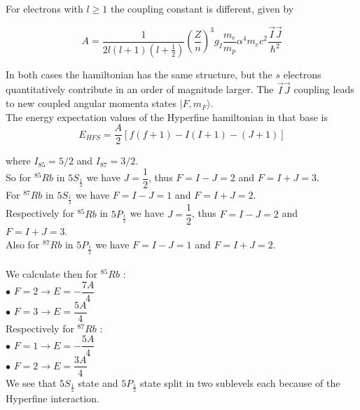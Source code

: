 \documentclass[openany,11pt,a4paper]{book}
\begin{document}
For electrons with $l \geq 1$ the coupling constant is different, given by 

\begin{equation}
A= \dfrac{1}{2l(l+1)(l+ \frac{1}{2})} (\dfrac{Z}{n})^{3} g_{I} \dfrac{m_{e}}{m_{p}}\alpha^{4} m_{e} c^{2} \dfrac{\vec{I} \vec{J}}{\hbar^{2}}
\end{equation}

In both cases the hamiltonian has the same structure, but the $s$ electrons quantitatively contribute in an order of magnitude larger. The $\vec{I} \vec{J}$ coupling leads to new coupled angular momenta states $\vert F, m_{F}\rangle$.\\

The energy expectation values of the Hyperfine hamiltonian in that base is 
\begin{equation}
E_{HFS}= \dfrac{A}{2} [f(f+1) -I(I+1)-(J+1)]
\end{equation}

where $I_{85}=5/2$ and $I_{87}=3/2$.\\

So for $^{85}Rb$ in $5S_{\frac{1}{2}}$ we have $J=\dfrac{1}{2}$, thus $F= I- J=2$ and $F=I+J=3$.\\

For $^{87}Rb$ in $5S_{\frac{1}{2}}$ we have $F= I- J=1$ and $F=I+J=2$.\\

Respectively for $^{85}Rb$ in $5P_{\frac{1}{2}}$ we have $J=\dfrac{1}{2}$, thus $F= I- J=2$ and $F=I+J=3$.\\

Also for $^{87}Rb$ in $5P_{\frac{1}{2}}$ we have $F= I- J=1$ and $F=I+J=2$.\\\\

We calculate then for $^{85}Rb$ :\\

$\bullet$ $F=2 \rightarrow E=-\dfrac{7A}{4}$\\
$\bullet$ $F=3 \rightarrow  E=\dfrac{5A}{4}$\\

Respectively for  $^{87}Rb$                :\\

$\bullet$ $F=1 \rightarrow  E=-\dfrac{5A}{4}$\\
$\bullet$ $F=2 \rightarrow  E=\dfrac{3A}{4}$\\

We see that $5S_{\frac{1}{2}}$ state and $5P_{\frac{1}{2}}$ state split in two sublevels each because of the Hyperfine interaction.\\
\end{document}
